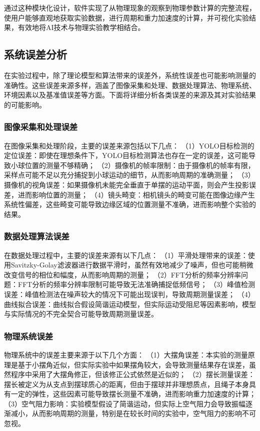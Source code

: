 通过这种模块化设计，软件实现了从物理现象的观察到物理参数计算的完整流程，使用户能够直观地获取实验数据，进行周期和重力加速度的计算，并可视化实验结果，有效地将AI技术与物理实验教学相结合。

\subsection{系统误差分析}

在实验过程中，除了理论模型和算法带来的误差外，系统性误差也可能影响测量的准确性。这些误差来源多样，涵盖了图像采集和处理、数据处理算法、物理系统、环境因素以及基准值误差等方面。下面将详细分析各类误差的来源及其对实验结果的可能影响。

\subsubsection{图像采集和处理误差}  
在图像采集和处理阶段，主要的误差来源包括以下几点：
（1）YOLO目标检测的定位误差：即使在理想条件下，YOLO目标检测算法也存在一定的误差，这可能导致小球位置的测量不够精确；
（2）摄像机的帧率限制：由于摄像机的帧率有限，采样点可能不足以充分捕捉到小球运动的细节，从而影响周期的准确测量；
（3）摄像机的视角误差：如果摄像机未能完全垂直于单摆的运动平面，则会产生投影误差，进而影响位置的测量；
（4）镜头畸变：相机镜头的畸变可能在图像边缘产生系统性偏差，这些畸变可能导致边缘区域的位置测量不准确，进而影响整个实验的结果。

\subsubsection{数据处理算法误差}  
在数据处理过程中，主要的误差来源有以下几点：
（1）平滑处理带来的误差：使用Savitzky-Golay滤波器进行数据平滑时，虽然有效地减少了噪声，但也可能稍微改变信号的相位和幅度，从而影响周期的测量；
（2）FFT分析的频率分辨率问题：FFT分析的频率分辨率限制可能导致无法准确捕捉低频信号；
（3）峰值检测误差：峰值检测法在噪声较大的情况下可能出现误判，导致周期测量误差；
（4）曲线拟合误差：曲线拟合假设简谐运动模型，但实际运动受阻尼等因素影响，模型与实际情况的不完全契合可能导致周期测量误差。

\subsubsection{物理系统误差}  
物理系统中的误差主要来源于以下几个方面：
（1）大摆角误差：本实验的测量原理是基于小摆角近似，但实际实验中如果摆角较大，会导致测量结果存在误差，虽然程序中采用了大摆角修正，但该修正公式依然是近似的；
（2）摆长测量误差：摆长被定义为从支点到摆球质心的距离，但由于摆球并非理想质点，且绳子本身具有一定的弹性，这些因素可能导致摆长测量不准确，进而影响重力加速度的计算；
（3）空气阻力影响：实验模型假设了简谐运动，但实际上空气阻力会导致振幅逐渐减小，从而影响周期的测量，特别是在较长时间的实验中，空气阻力的影响不可忽视。


